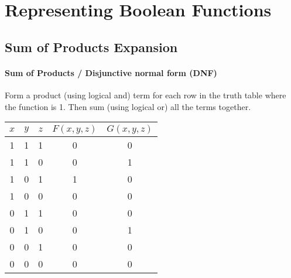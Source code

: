 \documentclass[12pt letter]{report}
\begin{document}
\chapter{Representing Boolean Functions}

\section{Sum of Products Expansion}




\subsubsection{Sum of Products / Disjunctive normal form (DNF)}

Form a product (using logical and) term for each row in the truth table where the function is 1. Then sum (using logical or) all the terms together.

\begin{table}[h!]
	\begin{center}
		\begin{tabular}{|c c c|c|c|}
			\hline
			$x$ & $y$ & $z$ & $F \left( x, y, z \right) $ & $G \left( x,y,z \right) $ \\ [0.5ex]
			\hline
			\hline
			1   & 1   & 1   & 0                           & 0                         \\
			1   & 1   & 0   & 0                           & 1                         \\
			1   & 0   & 1   & 1                           & 0                         \\
			1   & 0   & 0   & 0                           & 0                         \\
			0   & 1   & 1   & 0                           & 0                         \\
			0   & 1   & 0   & 0                           & 1                         \\
			0   & 0   & 1   & 0                           & 0                         \\
			0   & 0   & 0   & 0                           & 0                         \\
			\hline
		\end{tabular}
	\end{center}
\end{table}
\end{document}
